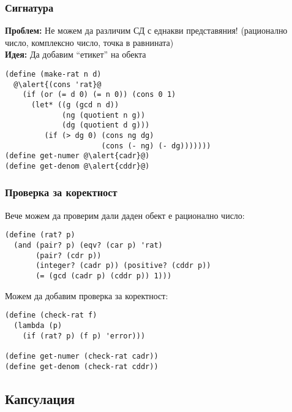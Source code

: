 \documentclass[alsotrans]{beamerswitch}
\begin{document}
\begin{frame}[fragile]
  \frametitle{Сигнатура}

  \sizeboth\footnotesize
  \textbf{Проблем:} Не можем да различим СД с еднакви представяния! (рационално число, комплексно число, точка в равнината)\\
  \pause
  \textbf{Идея:} Да добавим ``етикет'' на обекта
  \begin{center}
  \end{center}
  \pause
  \vspace{-.5ex}
\begin{lstlisting}
(define (make-rat n d)
  @\alert{(cons 'rat}@
    (if (or (= d 0) (= n 0)) (cons 0 1)
      (let* ((g (gcd n d))
             (ng (quotient n g))
             (dg (quotient d g)))
         (if (> dg 0) (cons ng dg)
                      (cons (- ng) (- dg)))))))
(define get-numer @\alert{cadr}@)
(define get-denom @\alert{cddr}@)
\end{lstlisting}
\end{frame}

\begin{frame}[fragile]
  \frametitle{Проверка за коректност}

  Вече можем да проверим дали даден обект е рационално число:
\begin{lstlisting}
(define (rat? p)
  (and (pair? p) (eqv? (car p) 'rat)
       (pair? (cdr p))
       (integer? (cadr p)) (positive? (cddr p))
       (= (gcd (cadr p) (cddr p)) 1)))
\end{lstlisting}
  \pause
  Можем да добавим проверка за коректност:
\begin{lstlisting}
(define (check-rat f)
  (lambda (p)
    (if (rat? p) (f p) 'error)))

(define get-numer (check-rat cadr))
(define get-denom (check-rat cddr))
\end{lstlisting}
\end{frame}

\subsection{Капсулация}
\end{document}
